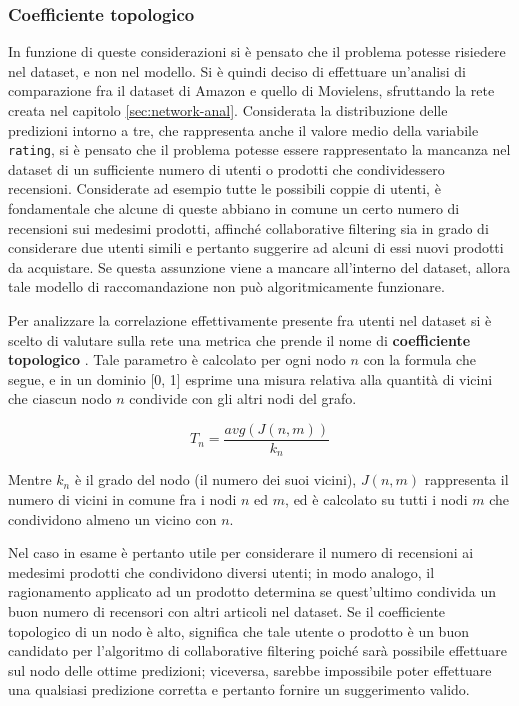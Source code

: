 \documentclass[hidelinks, 12pt]{article}
\begin{document}
\subsubsection{Coefficiente topologico}

In funzione di queste considerazioni si è pensato che il problema potesse risiedere nel dataset, e non nel modello. Si è quindi deciso di effettuare un'analisi di comparazione fra il dataset di Amazon e quello di Movielens, sfruttando la rete creata nel capitolo \ref{sec:network-anal}. Considerata la distribuzione delle predizioni intorno a tre, che rappresenta anche il valore medio della variabile \texttt{rating}, si è pensato che il problema potesse essere rappresentato la mancanza nel dataset di un sufficiente numero di utenti o prodotti che condividessero recensioni. Considerate ad esempio tutte le possibili coppie di utenti, è fondamentale che alcune di queste abbiano in comune un certo numero di recensioni sui medesimi prodotti, affinché collaborative filtering sia in grado di considerare due utenti simili e pertanto suggerire ad alcuni di essi nuovi prodotti da acquistare. Se questa assunzione viene a mancare all'interno del dataset, allora tale modello di raccomandazione non può algoritmicamente funzionare.

Per analizzare la correlazione effettivamente presente fra utenti nel dataset si è scelto di valutare sulla rete una metrica che prende il nome di \textbf{coefficiente topologico} \cite{site:topol-coeff}. Tale parametro è calcolato per ogni nodo $n$ con la formula che segue, e in un dominio [0, 1] esprime una misura relativa alla quantità di vicini che ciascun nodo $n$ condivide con gli altri nodi del grafo. 

\[T_n = \frac{avg(J(n,m))}{k_n} \]

Mentre $k_n$ è il grado del nodo (il numero dei suoi vicini), $J(n,m)$ rappresenta il numero di vicini in comune fra i nodi $n$ ed $m$, ed è calcolato su tutti i nodi $m$ che condividono almeno un vicino con $n$.

Nel caso in esame è pertanto utile per considerare il numero di recensioni ai medesimi prodotti che condividono diversi utenti; in modo analogo, il ragionamento applicato ad un prodotto determina se quest'ultimo condivida un buon numero di recensori con altri articoli nel dataset. Se il coefficiente topologico di un nodo è alto, significa che tale utente o prodotto è un buon candidato per l'algoritmo di collaborative filtering poiché sarà possibile effettuare sul nodo delle ottime predizioni; viceversa, sarebbe impossibile poter effettuare una qualsiasi predizione corretta e pertanto fornire un suggerimento valido.
\end{document}

